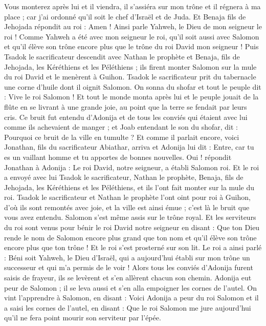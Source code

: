 \begin{multicols}{2}
Vous monterez après lui et il viendra, il s'assiéra sur mon trône et il régnera à ma place ; car j'ai ordonné qu'il soit le chef d'Israël et de Juda.
Et Benaja fils de Jehojada répondit au roi : Amen ! Ainsi parle Yahweh, le Dieu de mon seigneur le roi !
Comme Yahweh a été avec mon seigneur le roi, qu'il soit aussi avec Salomon et qu'il élève son trône encore plus que le trône du roi David mon seigneur !
Puis Tsadok le sacrificateur descendit avec Nathan le prophète et Benaja, fils de Jehojada, les Kéréthiens et les Péléthiens ; ils firent monter Salomon sur la mule du roi David et le menèrent à Guihon.
Tsadok le sacrificateur prit du tabernacle une corne d'huile dont il oignit Salomon. On sonna du shofar et tout le peuple dit : Vive le roi Salomon !
Et tout le monde monta après lui et le peuple jouait de la flûte en se livrant à une grande joie, au point que la terre se fendait par leurs cris.
Ce bruit fut entendu d’Adonija et de tous les conviés qui étaient avec lui comme ils achevaient de manger ; et Joab entendant le son du shofar, dit : Pourquoi ce bruit de la ville en tumulte ?
Et comme il parlait encore, voici Jonathan, fils du sacrificateur Abiathar, arriva et Adonija lui dit : Entre, car tu es un vaillant homme et tu apportes de bonnes nouvelles.
Oui ! répondit Jonathan à Adonija : Le roi David, notre seigneur, a établi Salomon roi.
Et le roi a envoyé avec lui Tsadok le sacrificateur, Nathan le prophète, Benaja, fils de Jehojada, les Kéréthiens et les Péléthiens, et ils l'ont fait monter sur la mule du roi.
Tsadok le sacrificateur et Nathan le prophète l'ont oint pour roi à Guihon, d'où ils sont remontés avec joie, et la ville est ainsi émue ; c'est là le bruit que vous avez entendu.
Salomon s'est même assis sur le trône royal.
Et les serviteurs du roi sont venus pour bénir le roi David notre seigneur en disant : Que ton Dieu rende le nom de Salomon encore plus grand que ton nom et qu'il élève son trône encore plus que ton trône ! Et le roi s'est prosterné sur son lit.
Le roi a ainsi parlé : Béni soit Yahweh, le Dieu d'Israël, qui a aujourd’hui établi sur mon trône un successeur et qui m’a permis de le voir !
Alors tous les conviés d’Adonija furent saisis de frayeur, ils se levèrent et s'en allèrent chacun son chemin.
Adonija eut peur de Salomon ; il se leva aussi et s'en alla empoigner les cornes de l'autel.
On vint l’apprendre à Salomon, en disant : Voici Adonija a peur du roi Salomon et il a saisi les cornes de l'autel, en disant : Que le roi Salomon me jure aujourd'hui qu'il ne fera point mourir son serviteur par l'épée.

\end{multicols}
